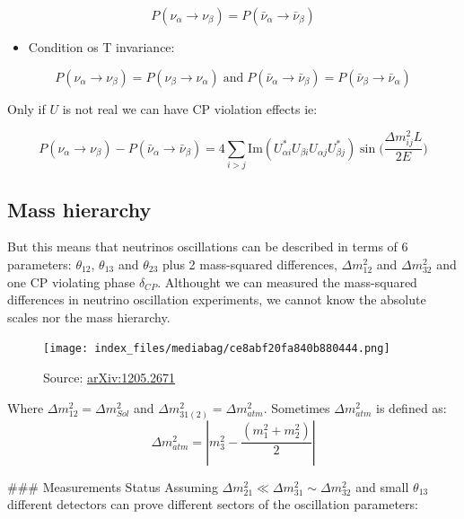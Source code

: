 \documentclass[
  letterpaper,
  DIV=11,
  numbers=noendperiod]{scrreprt}
\providecommand{\tightlist}{%
  \setlength{\itemsep}{0pt}\setlength{\parskip}{0pt}}\usepackage{longtable,booktabs,array}
\begin{document}
\[P(\nu_\alpha \rightarrow \nu_\beta) = P({\bar \nu_\alpha} \rightarrow {\bar \nu_\beta}) \]

\begin{itemize}
\tightlist
\item
  Condition os T invariance:
\end{itemize}

\[P({\nu_\alpha} \rightarrow {\nu_\beta}) = P({\nu_\beta} \rightarrow {\nu_\alpha})\mathrm{\; and\; }P({\bar \nu_\alpha} \rightarrow {\bar \nu_\beta}) = P({\bar \nu_\beta} \rightarrow {\bar\nu_\alpha})\]

Only if \(U\) is not real we can have CP violation effects ie:

\[P(\nu_\alpha \rightarrow \nu_\beta) - P({\bar \nu_\alpha} \rightarrow {\bar \nu_\beta}) ={ 4 \sum_{i>j}\mathrm{ Im}(U_{\alpha i}^{*}U_{\beta i}U_{\alpha j}U_{\beta j}^{*})\sin(}\frac{\Delta m_{ij}^{2}L}{2E})\]

\subsection{Mass hierarchy}\label{mass-hierarchy}

But this means that neutrinos oscillations can be described in terms of
6 parameters: \(\theta_{12}\), \(\theta_{13}\) and \(\theta_{23}\) plus
2 mass-squared differences, \(\Delta m_{12}^2\) and \(\Delta m_{32}^2\)
and one CP violating phase \(\delta_{CP}\). Althought we can measured
the mass-squared differences in neutrino oscillation experiments, we
cannot know the absolute scales nor the mass hierarchy.

\begin{figure}[H]

{\centering \texttt{[image: index\_files/mediabag/ce8abf20fa840b880444.png]}

}

\caption{Source:
\href{https://inspirehep.net/record/1114323}{arXiv:1205.2671}}

\end{figure}%

Where \(\Delta m_{12}^2 = \Delta m_{Sol}^2\) and
\(\Delta m_{31(2)}^2 = \Delta m_{atm}^2\). Sometimes
\(\Delta m_{atm}^2\) is defined as:
\[\Delta m_{atm}^2  =\left| m_3^2 - \frac{(m_1^2 + m_2^2)}{2} \right|\]

\#\#\# Measurements Status Assuming
\(\Delta m_{21}^2 \ll \Delta m_{31}^2 \sim \Delta m_{32}^2\) and small
\(\theta_{13}\) different detectors can prove different sectors of the
oscillation parameters:
\end{document}
